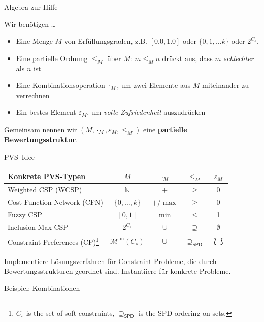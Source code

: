 \begin{frame}{Algebra zur Hilfe}

Wir benötigen \ldots 

\begin{itemize}
\item Eine Menge $M$ von Erfüllungsgraden, z.B. $[0.0, 1.0]$ oder $\{0, 1, \ldots k\}$ oder $2^{C_s}$. \pause 
\item Eine partielle Ordnung $\leq_M$ über $M$: $m \leq_M n$ drückt aus, dass $m$ \emph{schlechter} als $n$ ist \pause 
\item Eine Kombinationsoperation $\cdot_M$, um zwei Elemente aus $M$ miteinander zu verrechnen  \pause 
\item Ein bestes Element $\varepsilon_M$, um \emph{volle Zufriedenheit} auszudrücken \pause
\end{itemize}
  
  Gemeinsam nennen wir $(M, \cdot_M, \varepsilon_M, \leq_M)$ eine \textbf{partielle Bewertungsstruktur}.
  
  \hfill \emph{\cite{Gadducci2013,SchiendorferPvs2015}}
\end{frame}


%

\begin{frame}[fragile]{PVS--Idee}
\begin{center}
\begin{tabular}{l|c|c|c|c}
\textbf{Konkrete PVS-Typen} & $M$ & $\cdot_M$ & $\leq_M$ & $\varepsilon_M$ \\ 
\hline 
Weighted CSP (WCSP)& $\mathbb{N}$ & $+$ & $\geq$ & $0$ \\ 
Cost Function Network (CFN)& $\{0,\ldots,k\}$ & $+$/$\max$ & $\geq$ & $0$ \\ 
Fuzzy CSP & $[0,1]$ & $\min$ & $\leq$  & 1 \\ 
Inclusion Max CSP & $2^{C_s}$ & $\cup$ & $\supseteq$  & $\emptyset$ \\ 
Constraint Preferences (CP)\footnote{$C_s$ is the set of soft constraints, $\supseteq_{\mathsf{SPD}}$ is the SPD-ordering on sets.} &$\mathcal{M}^{\mathrm{fin}} (C_s)$ & $\mcup$ & $\supseteq_{\mathsf{SPD}}$ & $\lbag \rbag$ \\ 
\end{tabular} 
\end{center}

\begin{parchment}[Hauptidee]
Implementiere Lösungsverfahren für Constraint-Probleme, die durch Bewertungsstrukturen geordnet sind. Instantiiere für konkrete Probleme.
\end{parchment}
\end{frame}

\begin{frame}{Beispiel: Kombinationen~\cite{SchiendorferPvs2015}}

\end{frame}

